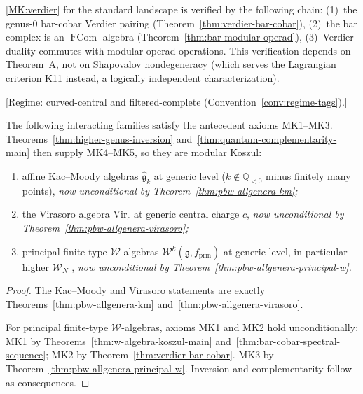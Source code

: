 \begin{remark}\label{rem:mk-verdier-verification-chain}
\ref{MK:verdier} for the standard landscape is verified by the following
chain: (1)~the genus-$0$ bar-cobar Verdier pairing
(Theorem~\ref{thm:verdier-bar-cobar}), (2)~the bar complex is an
$\operatorname{FCom}$-algebra
(Theorem~\ref{thm:bar-modular-operad}), (3)~Verdier duality commutes
with modular operad operations.  This verification depends on
Theorem~A, not on Shapovalov nondegeneracy (which serves the
Lagrangian criterion K11 instead, a logically independent
characterization).
\end{remark}

\begin{proposition}
\label{prop:conditional-modular-koszul}
\textup{[Regime: curved-central and filtered-complete
\textup{(}Convention~\textup{\ref{conv:regime-tags})}.]}

The following interacting families satisfy the antecedent axioms
\textup{MK1--MK3}.
Theorems~\textup{\ref{thm:higher-genus-inversion}}
and~\textup{\ref{thm:quantum-complementarity-main}}
then supply \textup{MK4--MK5}, so they are modular Koszul:
\begin{enumerate}[label=\textup{(\alph*)},start=3]
\item affine Kac--Moody algebras $\widehat{\mathfrak{g}}_k$ at generic
  level \textup{(}$k \notin \mathbb{Q}_{< 0}$ minus finitely many
  points\textup{)}, \emph{now unconditional by
  Theorem~\textup{\ref{thm:pbw-allgenera-km}};}
\item the Virasoro algebra $\mathrm{Vir}_c$ at generic central charge
  $c$, \emph{now unconditional by
  Theorem~\textup{\ref{thm:pbw-allgenera-virasoro}};}
\item principal finite-type $\mathcal{W}$-algebras
  $\mathcal{W}^k(\mathfrak{g}, f_{\mathrm{prin}})$ at generic level,
  in particular higher $\mathcal{W}_N$
  , \emph{now unconditional by
  Theorem~\textup{\ref{thm:pbw-allgenera-principal-w}}.}
\end{enumerate}
\end{proposition}

\begin{proof}
The Kac--Moody and Virasoro statements are exactly
Theorems~\ref{thm:pbw-allgenera-km}
and~\ref{thm:pbw-allgenera-virasoro}.

For principal finite-type $\mathcal{W}$-algebras, axioms MK1 and MK2 hold
unconditionally:
MK1 by
Theorems~\ref{thm:w-algebra-koszul-main}
and~\ref{thm:bar-cobar-spectral-sequence};
MK2 by Theorem~\ref{thm:verdier-bar-cobar}.
MK3 by Theorem~\ref{thm:pbw-allgenera-principal-w}.
Inversion and complementarity follow as consequences.
\end{proof}

